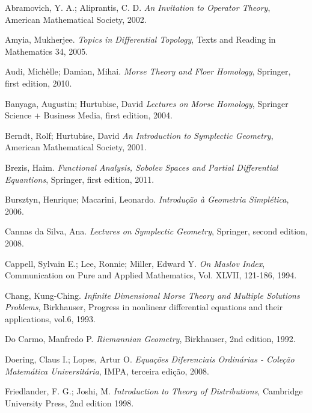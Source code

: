 \documentclass[12pt]{book}
\begin{document}
	
	\begin{thebibliography}{9}
		Abramovich, Y. A.; Aliprantis, C. D.
		\emph{An Invitation to Operator Theory},
		American Mathematical Society, 2002.
		
		Amyia, Mukherjee.
		\emph{Topics in Differential Topology},
		Texts and Reading in Mathematics 34,
		2005.
		
		Audi, Michèlle; Damian, Mihai.
		\emph{Morse Theory and Floer Homology},
		Springer, first edition,
		2010.
		
		Banyaga, Augustin; Hurtubise, David
		\emph{Lectures on Morse Homology},
		Springer Science + Business Media, first edition,
		2004.

		Berndt, Rolf; Hurtubise, David
		\emph{An Introduction to Symplectic Geometry},
		American Mathematical Society, 2001.
		
		Brezis, Haim.
		\emph{Functional Analysis, Sobolev Spaces and Partial Differential Equantions},
		Springer, first edition,
		2011.
		
		Bursztyn, Henrique; Macarini, Leonardo.
		\emph{Introdução à Geometria Simplética}, 2006.
		
		
		Cannas da Silva, Ana.
		\emph{Lectures on Symplectic Geometry}, Springer, second edition, 2008.
		
		Cappell, Sylvain E.; Lee, Ronnie; Miller, Edward Y.
		\emph{On Maslov Index}, Communication on Pure and Applied Mathematics, Vol. XLVII, 121-186, 1994.
		
		Chang, Kung-Ching.
		\emph{Infinite Dimensional Morse Theory and Multiple Solutions Problems}, Birkhauser, Progress in nonlinear differential equations and
		their applications, vol.6, 1993.
		
		Do Carmo, Manfredo P.
		\emph{Riemannian Geometry},
		Birkhauser, 2nd edition,
		1992.
		
		Doering, Claus I.; Lopes, Artur O.
		\emph{Equações Diferenciais Ordinárias - Coleção Matemática Universitária},
		IMPA, terceira edição,
		2008.
		
		Friedlander, F. G.; Joshi, M.
		\emph{Introduction to Theory of Distributions},
		Cambridge University Press, 2nd edition
		1998.
		

\end{thebibliography}
\end{document}
